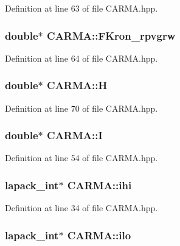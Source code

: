 Definition at line 63 of file C\-A\-R\-M\-A.\-hpp.

\hypertarget{class_c_a_r_m_a_ae089a1c6d303b4c9573c943c0a729269}{
\subsubsection[{F\-Kron\-\_\-rpvgrw}]{\setlength{\rightskip}{0pt plus 5cm}double$\ast$ C\-A\-R\-M\-A\-::\-F\-Kron\-\_\-rpvgrw}}\label{class_c_a_r_m_a_ae089a1c6d303b4c9573c943c0a729269}


Definition at line 64 of file C\-A\-R\-M\-A.\-hpp.

\hypertarget{class_c_a_r_m_a_aa2f506e700aa176fd5d8866552aa1f83}{
\subsubsection[{H}]{\setlength{\rightskip}{0pt plus 5cm}double$\ast$ C\-A\-R\-M\-A\-::\-H}}\label{class_c_a_r_m_a_aa2f506e700aa176fd5d8866552aa1f83}


Definition at line 70 of file C\-A\-R\-M\-A.\-hpp.

\hypertarget{class_c_a_r_m_a_ab07ac5e7150cb4674150f4c27ce4afd7}{
\subsubsection[{I}]{\setlength{\rightskip}{0pt plus 5cm}double$\ast$ C\-A\-R\-M\-A\-::\-I}}\label{class_c_a_r_m_a_ab07ac5e7150cb4674150f4c27ce4afd7}


Definition at line 54 of file C\-A\-R\-M\-A.\-hpp.

\hypertarget{class_c_a_r_m_a_a3def910e9268fefd309b90a98e13d323}{
\subsubsection[{ihi}]{\setlength{\rightskip}{0pt plus 5cm}lapack\-\_\-int$\ast$ C\-A\-R\-M\-A\-::ihi}}\label{class_c_a_r_m_a_a3def910e9268fefd309b90a98e13d323}


Definition at line 34 of file C\-A\-R\-M\-A.\-hpp.

\hypertarget{class_c_a_r_m_a_a2faca89f81a95b8d788445b99527d79c}{
\subsubsection[{ilo}]{\setlength{\rightskip}{0pt plus 5cm}lapack\-\_\-int$\ast$ C\-A\-R\-M\-A\-::ilo}}\label{class_c_a_r_m_a_a2faca89f81a95b8d788445b99527d79c}


